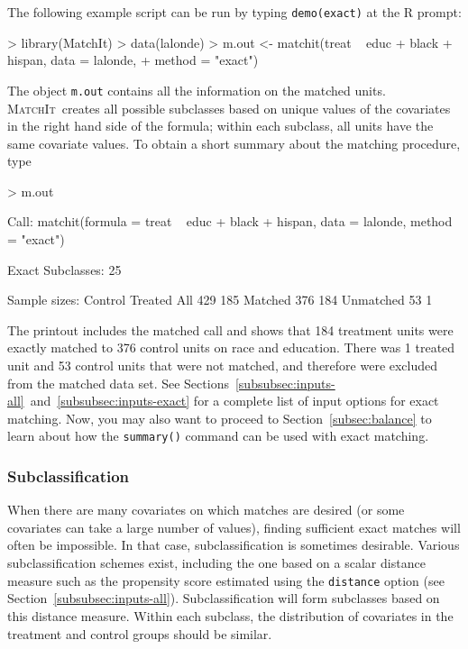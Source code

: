 \documentclass[oneside,letterpaper,titlepage]{article}
\newcommand{\MatchIt}{\textsc{MatchIt}}
\begin{document}
The following example script can be run by typing {\tt demo(exact)} at
the R prompt:
\begin{Schunk}
\begin{Sinput}
> library(MatchIt)
> data(lalonde)
> m.out <- matchit(treat ~ educ + black + hispan, data = lalonde, 
+     method = "exact")
\end{Sinput}
\end{Schunk}
The object \texttt{m.out} contains all the information on the matched
units.  \MatchIt\ creates all possible subclasses based on unique
values of the covariates in the right hand side of the formula; within
each subclass, all units have the same covariate values.  To obtain
a short summary about the matching procedure, type
\begin{Schunk}
\begin{Sinput}
> m.out
\end{Sinput}
\begin{Soutput}
Call: 
matchit(formula = treat ~ educ + black + hispan, data = lalonde, 
    method = "exact")

Exact Subclasses: 25

Sample sizes:
          Control Treated
All           429     185
Matched       376     184
Unmatched      53       1
\end{Soutput}
\end{Schunk}
The printout includes the matched call and shows that
184 treatment units were
exactly matched to 376
control units on race and education. There was
1 treated unit and
53 control units that were
not matched, and therefore were excluded from the matched data set.
See
Sections~\ref{subsubsec:inputs-all}~and~\ref{subsubsec:inputs-exact}
for a complete list of input options for exact matching.  Now, you may
also want to proceed to Section~\ref{subsec:balance} to learn about
how the {\tt summary()} command can be used with exact matching.

\subsubsection{Subclassification}
\label{subsubsec:subclass}

When there are many covariates 
on which matches are desired (or some covariates can take a large
number of values), finding sufficient
exact matches will often be impossible.  In that case,
subclassification is sometimes desirable. Various subclassification
schemes exist, including the one based on a scalar distance measure
such as the propensity score estimated using the \texttt{distance}
option (see Section~\ref{subsubsec:inputs-all}).  Subclassification
will form subclasses based on this distance measure.  Within each
subclass, the distribution of covariates in the treatment and control
groups should be similar.
\end{document}
